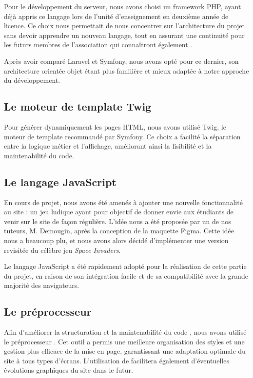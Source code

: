 Pour le développement du serveur, nous avons choisi un framework PHP, ayant déjà appris ce langage lors de l’unité d’enseignement  en deuxième année de licence. Ce choix nous permettait de nous concentrer sur l’architecture du projet sans devoir apprendre un nouveau langage, tout en assurant une continuité pour les futurs membres de l’association qui connaîtront également .

Après avoir comparé Laravel et Symfony, nous avons opté pour ce dernier, son architecture orientée objet étant plus familière et mieux adaptée à notre approche du développement.

\subsection{Le moteur de template Twig}

Pour générer dynamiquement les pages HTML, nous avons utilisé Twig, le moteur de template recommandé par Symfony. Ce choix a facilité la séparation entre la logique métier et l'affichage, améliorant ainsi la lisibilité et la maintenabilité du code.

\subsection{Le langage JavaScript}

En cours de projet, nous avons été amenés à ajouter une nouvelle fonctionnalité au site : un jeu ludique ayant pour objectif de donner envie aux étudiants de venir sur le site de façon régulière.
L'idée nous a été proposée par un de nos tuteurs, M. Demougin, après la conception de la maquette Figma.  
Cette idée nous a beaucoup plu, et nous avons alors décidé d'implémenter une version revisitée du célèbre jeu \textit{Space Invaders}. 

Le langage JavaScript a été rapidement adopté pour la réalisation de cette partie du projet, en raison de son intégration facile et de sa compatibilité avec la grande majorité des navigateurs.

\subsection{Le préprocesseur }

Afin d’améliorer la structuration et la maintenabilité du code , nous avons utilisé le préprocesseur . Cet outil a permis une meilleure organisation des styles et une gestion plus efficace de la mise en page, garantissant une adaptation optimale du site à tous types d’écrans. L’utilisation de  facilitera également d’éventuelles évolutions graphiques du site dans le futur.

